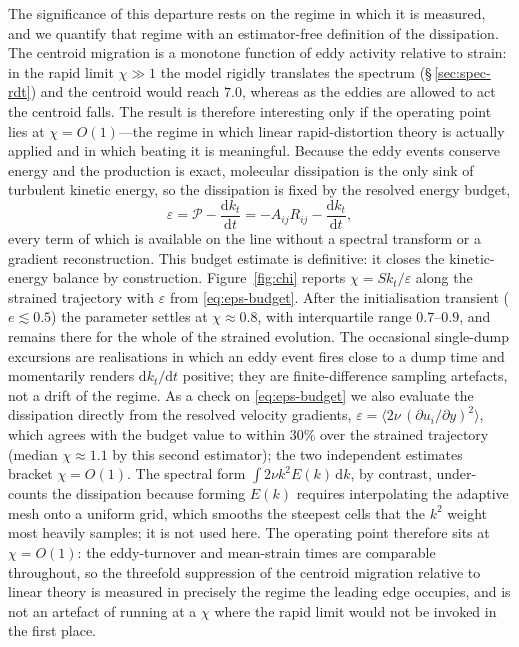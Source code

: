 \documentclass[lineno]{JFM-FLM_Au}
\begin{document}
The significance of this departure rests on the regime in which it is measured,
and we quantify that regime with an estimator-free definition of the
dissipation. The centroid migration is a monotone function of eddy activity
relative to strain: in the rapid limit $\chi\gg1$ the model rigidly translates
the spectrum (\S\,\ref{sec:spec-rdt}) and the centroid would reach $7.0$,
whereas as the eddies are allowed to act the centroid falls. The result is
therefore interesting only if the operating point lies at $\chi=O(1)$---the
regime in which linear rapid-distortion theory is actually applied and in which
beating it is meaningful. Because the eddy events conserve energy and the
production is exact, molecular dissipation is the only sink of turbulent kinetic
energy, so the dissipation is fixed by the resolved energy budget,
\begin{equation}
  \varepsilon = \mathcal{P} - \frac{\mathrm{d}k_t}{\mathrm{d}t}
              = -A_{ij}R_{ij} - \frac{\mathrm{d}k_t}{\mathrm{d}t},
  \label{eq:eps-budget}
\end{equation}
every term of which is available on the line without a spectral transform or a
gradient reconstruction. This budget estimate is definitive: it closes the
kinetic-energy balance by construction. Figure~\ref{fig:chi} reports
$\chi=Sk_t/\varepsilon$ along the strained trajectory with $\varepsilon$ from
\eqref{eq:eps-budget}. After the initialisation transient ($e\lesssim0.5$) the
parameter settles at $\chi\approx0.8$, with interquartile range $0.7$--$0.9$, and
remains there for the whole of the strained evolution. The occasional single-dump
excursions are realisations in which an eddy event fires close to a dump time and
momentarily renders $\mathrm{d}k_t/\mathrm{d}t$ positive; they are
finite-difference sampling artefacts, not a drift of the regime. As a check on
\eqref{eq:eps-budget} we also evaluate the dissipation directly from the resolved
velocity gradients, $\varepsilon=\langle 2\nu\,(\partial u_i/\partial
y)^2\rangle$, which agrees with the budget value to within $30\%$ over the
strained trajectory (median $\chi\approx1.1$ by this second estimator); the two
independent estimates bracket $\chi=O(1)$. The spectral form $\int 2\nu k^2
E(k)\,\mathrm{d}k$, by contrast, under-counts the dissipation because forming
$E(k)$ requires interpolating the adaptive mesh onto a uniform grid, which smooths
the steepest cells that the $k^2$ weight most heavily samples; it is not used
here. The operating point therefore sits at $\chi=O(1)$: the eddy-turnover and
mean-strain times are comparable throughout, so the threefold suppression of the
centroid migration relative to linear theory is measured in precisely the regime
the leading edge occupies, and is not an artefact of running at a $\chi$ where the
rapid limit would not be invoked in the first place.
\end{document}
